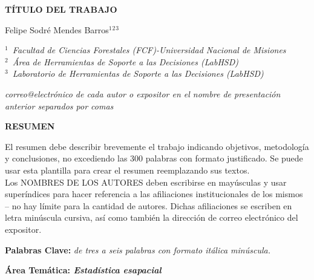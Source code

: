 \documentclass[11pt]{article}
\begin{document}
\begin{center}
\begin{Large}
\textbf{TÍTULO DEL TRABAJO}
\end{Large}
\vspace{0.6cm}

Felipe Sodré Mendes Barros$^1$$^2$$^3$ 

\vspace{0.6cm}
\textit{$^1$\  Facultad de Ciencias Forestales (FCF)-Universidad Nacional de Misiones}\\
\textit{$^2$\ Área de Herramientas de Soporte a las Decisiones (LabHSD)}\\
\textit{$^3$\ Laboratorio de Herramientas de Soporte a las Decisiones (LabHSD)}

\vspace{0.6cm}
\textit{correo@electrónico de cada autor o expositor en el nombre de presentación anterior separados por comas}
\end{center}

\begin{center}
\vspace{0.9cm}
\begin{Large}
\textbf{RESUMEN}
\end{Large}
\end{center}
El resumen debe describir brevemente el trabajo indicando objetivos, metodología y conclusiones, no excediendo las 300 palabras con formato justificado. Se puede usar esta plantilla para crear el resumen reemplazando sus textos. \\
Los NOMBRES DE LOS AUTORES deben escribirse en mayúsculas y usar superíndices para hacer referencia a las afiliaciones institucionales de los mismos – no hay límite para la cantidad de autores. Dichas afiliaciones se escriben en letra minúscula cursiva, así como también la dirección de correo electrónico del expositor. 

\vspace{0.9cm}

\noindent \textbf{Palabras Clave:} \textit{de tres a seis palabras con formato itálica minúscula.}

\vspace{0.9cm}

\noindent \textbf{Área Temática: \textit{Estadística esapacial}}
\end{document}
